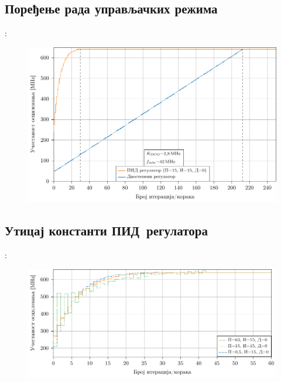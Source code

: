 \documentclass[aspectratio=169]{beamer}
\def \PID  {ПИД} %
\begin{document}
\subsection{Поређење рада управљачких режима}


\begin{frame}{\secname: \subsecname}
    \begin{figure}[!t]
	    \centering
	    \includegraphics[scale=0.75]{slike/prezentacija/py_pid_vs_cnt_1.pdf}
    \end{figure}
\end{frame}

\subsection{Утицај константи \PID\ регулатора}

\begin{frame}{\secname: \subsecname}
    \begin{figure}[!t]
	    \centering
	    \includegraphics[scale=0.8]{slike/prezentacija/py_pid_kp_tuning.pdf}
    \end{figure}
\end{frame}
\end{document}
